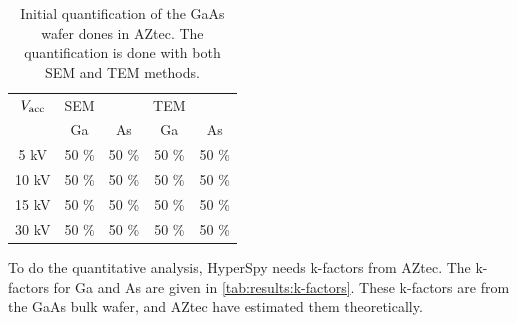 



\begin{table}[h]
    \centering
    \caption{
        Initial quantification of the GaAs wafer dones in AZtec.
        The quantification is done with both SEM and TEM methods.
    }
    \label{tab:initial_quantification}
    \begin{tabular}{ccccc}
        $V_\textnormal{acc}$ & SEM   &       & TEM   &       \\
                             & Ga    & As    & Ga    & As    \\
        \hline
        5 kV                 & 50 \% & 50 \% & 50 \% & 50 \% \\
        10 kV                & 50 \% & 50 \% & 50 \% & 50 \% \\
        15 kV                & 50 \% & 50 \% & 50 \% & 50 \% \\
        30 kV                & 50 \% & 50 \% & 50 \% & 50 \%
    \end{tabular}
\end{table}

To do the quantitative analysis, HyperSpy needs k-factors from AZtec.
The k-factors for Ga and As are given in \cref{tab:results:k-factors}.
These k-factors are from the GaAs bulk wafer, and AZtec have estimated them theoretically.

